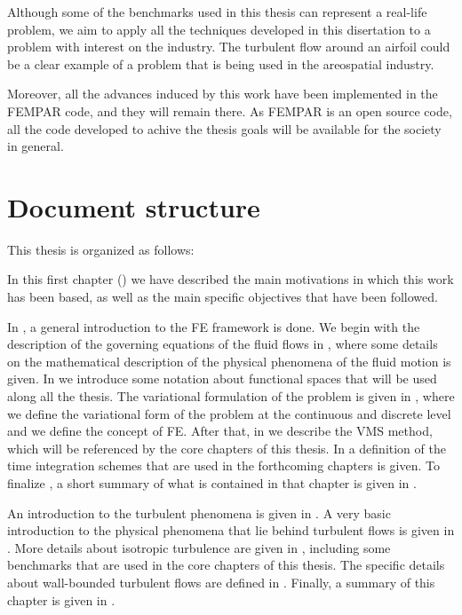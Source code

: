 \begin{itemize}
Although some of the benchmarks used in this thesis can represent a real-life problem, we aim to apply all the techniques developed in this disertation to a problem with interest on the industry. The turbulent flow around an airfoil could be a clear example of a problem that is being used in the areospatial industry.

Moreover, all the advances induced by this work have been implemented in the FEMPAR code, and they will remain there. As FEMPAR is an open source code, all the code developed to achive the thesis goals will be available for the society in general.


\end{itemize}

\section{Document structure}

This thesis is organized as follows:

In this first chapter () we have described the main motivations in which this work has been based, as well as the main specific objectives that have been followed.

In , a general introduction to the FE framework is done. We begin with the description of the governing equations of the fluid flows in , where some details on the mathematical description of the physical phenomena of the fluid motion is given. In  we introduce some notation about functional spaces that will be used along all the thesis. The variational formulation of the problem is given in , where we define the variational form of the problem at the continuous and discrete level and we define the concept of FE. After that, in  we describe the VMS method, which will be referenced by the core chapters of this thesis. In  a definition of the time integration schemes that are used in the forthcoming chapters is given. To finalize , a short summary of what is contained in that chapter is given in .

An introduction to the turbulent phenomena is given in . A very basic introduction to the physical phenomena that lie behind turbulent flows is given in . More details about isotropic turbulence are given in , including some benchmarks that are used in the core chapters of this thesis. The specific details about wall-bounded turbulent flows are defined in . Finally, a summary of this chapter is given in .

